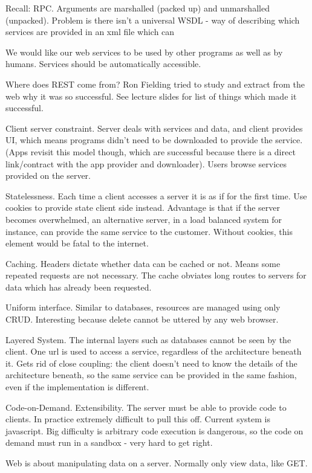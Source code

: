 \documentclass[11pt]{article}
\begin{document}
Recall: RPC. Arguments are marshalled (packed up) and unmarshalled (unpacked). Problem is there isn’t a universal WSDL - way of describing which services are provided in an xml file which can 

We would like our web services to be used by other programs as well as by humans. Services should be automatically accessible.

Where does REST come from? Ron Fielding tried to study and extract from the web why it was so successful. See lecture slides for list of things which made it successful.

Client server constraint. Server deals with services and data, and client provides UI, which means programs didn't need to be downloaded to provide the service. (Apps revisit this model though, which are successful because there is a direct link/contract with the app provider and downloader). Users browse services provided on the server.

Statelessness. Each time a client accesses a server it is as if for the first time. Use cookies to provide state client side instead. Advantage is that if the server becomes overwhelmed, an alternative server, in a load balanced system for instance, can provide the same service to the customer. Without cookies, this element would be fatal to the internet.

Caching. Headers dictate whether data can be cached or not. Means some repeated requests are not necessary. The cache obviates long routes to servers for data which has already been requested.

Uniform interface. Similar to databases, resources are managed using only CRUD. Interesting because delete cannot be uttered by any web browser.

Layered System. The internal layers such as databases cannot be seen by the client. One url is used to access a service, regardless of the architecture beneath it. Gets rid of close coupling: the client doesn't need to know the details of the architecture beneath, so the same service can be provided in the same fashion, even if the implementation is different.

Code-on-Demand. Extensibility. The server must be able to provide code to clients. In practice extremely difficult to pull this off. Current system is javascript. Big difficulty is arbitrary code execution is dangerous, so the code on demand must run in a sandbox - very hard to get right.

Web is about manipulating data on a server. Normally only view data, like GET.
\end{document}
